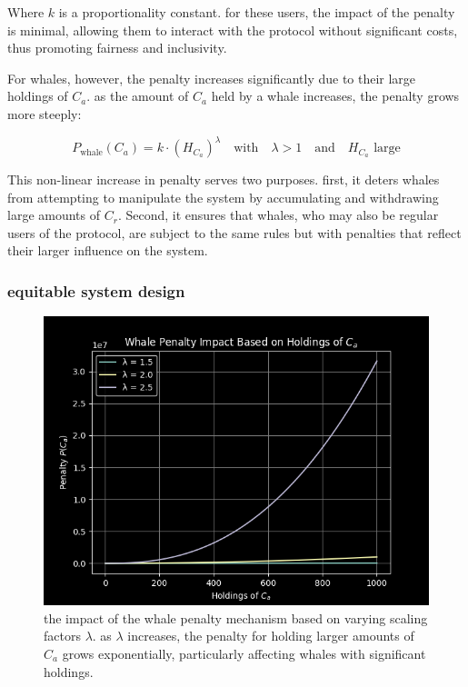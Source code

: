 \documentclass{article}
\begin{document}
Where $k$ is a proportionality constant. for these users, the impact of the penalty is minimal, allowing them to interact with the protocol without significant costs, thus promoting fairness and inclusivity.

For whales, however, the penalty increases significantly due to their large holdings of $C_a$. as the amount of $C_a$ held by a whale increases, the penalty grows more steeply:

\[
P_{\text{whale}}(C_a) = k \cdot \left(H_{C_a}\right)^\lambda \quad \text{with} \quad \lambda > 1 \quad \text{and} \quad H_{C_a} \text{ large}
\]

This non-linear increase in penalty serves two purposes. first, it deters whales from attempting to manipulate the system by accumulating and withdrawing large amounts of $C_r$. Second, it ensures that whales, who may also be regular users of the protocol, are subject to the same rules but with penalties that reflect their larger influence on the system.

\subsubsection{equitable system design}

\begin{figure}[h]
\centering
\includegraphics[width=\textwidth]{images/6.png}
\caption{the impact of the whale penalty mechanism based on varying scaling factors $\lambda$. as $\lambda$ increases, the penalty for holding larger amounts of $C_a$ grows exponentially, particularly affecting whales with significant holdings.}
\label{fig:whale_penalty}
\end{figure}
\end{document}
